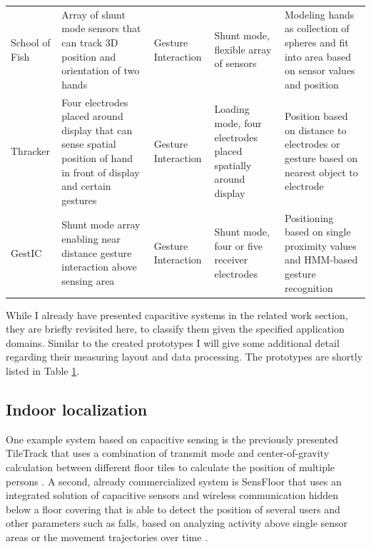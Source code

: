 \begin{table}[htbp]
\begin{tabularx}{\linewidth}{Xp{3.5cm}Xp{3.5cm}p{3.5cm}}
    School of Fish \cite{Smith1999a} & Array of shunt mode sensors that can track 3D position and orientation of two hands  & Gesture Interaction & Shunt mode, flexible array of sensors & Modeling hands as collection of spheres and fit into area based on sensor values and position \\
    Thracker \cite{Wimmer2006} & Four electrodes placed around display that can sense spatial position of hand in front of display and certain gestures & Gesture Interaction & Loading mode, four electrodes placed spatially around display & Position based on distance to electrodes or gesture based on nearest object to electrode \\
    GestIC \cite{microchip2013} & Shunt mode array enabling near distance gesture interaction above sensing area & Gesture Interaction & Shunt mode, four or five receiver electrodes & Positioning based on single proximity values and HMM-based gesture recognition \\
    \bottomrule
    \end{tabularx}%
  \label{tab:related_cap_proto}%
\end{table}%

While I already have presented capacitive systems in the related work section, they are briefly revisited here, to classify them given the specified application domains. Similar to the created prototypes I will give some additional detail regarding their measuring layout and data processing. The prototypes are shortly listed in Table \ref{tab:related_cap_proto}.

\subsection{Indoor localization}
One example system based on capacitive sensing is the previously presented TileTrack that uses a combination of transmit mode and center-of-gravity calculation between different floor tiles to calculate the position of multiple persons \cite{Valtonen2009a}. A second, already commercialized system is SensFloor that uses an integrated solution of capacitive sensors and wireless communication hidden below a floor covering that is able to detect the position of several users and other parameters such as falls, based on analyzing activity above single sensor areas or the movement trajectories over time \cite{lauterbach2009}.
